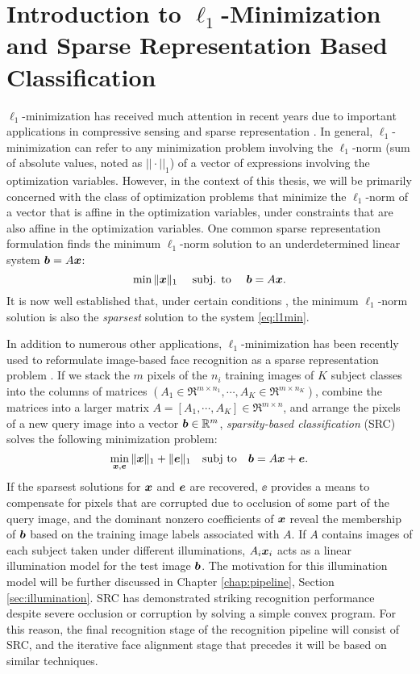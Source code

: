 \section{Introduction to $\ell_1$-Minimization and Sparse Representation Based Classification}
%
$\ell_1$-minimization has received much attention in recent years due to
important applications in compressive sensing \cite{BrucksteinA2007} and sparse
representation \cite{WrightJ2010-PIEEE}.  
In general, $\ell_1$-minimization can refer to any minimization problem involving the 
$\ell_1$-norm (sum of absolute values, noted as $||\cdot||_1$) of a vector of expressions involving the optimization
variables. However, in the context of this thesis, we will be primarily concerned with
the class of optimization problems that minimize the $\ell_1$-norm of a vector that
is affine in the optimization variables, under constraints that are also affine in the optimization variables.
One common sparse representation formulation finds the minimum $\ell_1$-norm solution to an
underdetermined linear system $\boldsymbol{b}=A{\boldsymbol{x}}$:
%
\begin{equation} 
\min \|{\boldsymbol{x}}\|_1\quad \mbox{ subj. to }\quad \boldsymbol{b} = A{\boldsymbol{x}}.
\label{eq:l1min} 
\end{equation}
%
It is now well established that, under certain conditions
\cite{CandesE2005-IT,DonohoD2004}, the minimum $\ell_1$-norm solution is also
the \emph{sparsest} solution to the system \eqref{eq:l1min}.

In addition to numerous other applications, $\ell_1$-minimization has been recently used to reformulate
image-based face recognition as a sparse representation problem
\cite{WrightJ2009-PAMI}.  If we stack the $m$ pixels of the $n_i$ training images of $K$ subject
classes into the columns of matrices $(A_1\in\Re^{m\times n_1}, \cdots, A_K\in\Re^{m\times n_K})$, combine
the matrices into a larger matrix $A = [A_1, \cdots, A_K]\in\Re^{m\times n}$, and arrange the pixels of a new
query image into a vector $\boldsymbol{b}\in\mathbb R^m$, \emph{sparsity-based
classification} (SRC) solves the following minimization problem:
\begin{equation}
\min_{{\boldsymbol{x}}, {\boldsymbol{e}}} \| {\boldsymbol{x}} \|_1 + \|{\boldsymbol{e}}\|_1 \quad \textup{subj to} \quad \boldsymbol{b} = A {\boldsymbol{x}} + {\boldsymbol{e}}.
\label{eq:l1min_denoise}
\end{equation}
If the sparsest solutions for ${\boldsymbol{x}}$ and $\boldsymbol{e}$ are recovered, $\ee$ provides a
means to compensate for pixels that are corrupted due to occlusion of some part of the query
image, and the dominant nonzero coefficients of ${\boldsymbol{x}}$ reveal the membership of
$\boldsymbol{b}$ based on the training image labels associated with $A$. 
If $A$ contains images of each subject taken under different illuminations, 
$A_i{\boldsymbol{x}}_i$ acts as a linear illumination model for the test image $\boldsymbol{b}$.  The motivation
for this illumination model will be further discussed in Chapter \ref{chap:pipeline}, Section \ref{sec:illumination}.
SRC has demonstrated striking recognition performance
despite severe occlusion or corruption by solving a simple convex program.  For
this reason, the final recognition stage of the recognition pipeline will consist of
SRC, and the iterative face alignment stage that precedes it will be based on
similar techniques.

